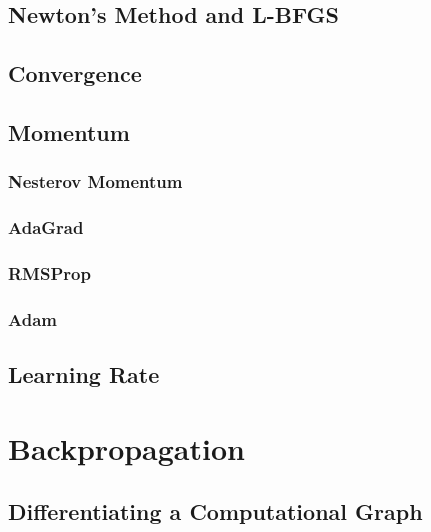 	\section{Newton's Method and L-BFGS} %

	\section{Convergence} %

	\section{Momentum} %

		\subsection{Nesterov Momentum} %

		\subsection{AdaGrad} %

		\subsection{RMSProp} %

		\subsection{Adam} %

	\section{Learning Rate} %

\chapter{Backpropagation} %

	\section{Differentiating a Computational Graph} %

